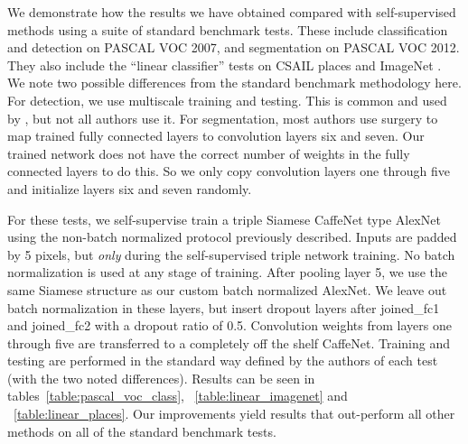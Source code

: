 \documentclass[10pt,twocolumn,letterpaper]{article}
\begin{document}
We demonstrate how the results we have obtained compared with self-supervised methods using a suite of standard benchmark tests. These include classification \cite{Krahenbuhl16}  and detection \cite{Girshick15} on PASCAL VOC 2007, and segmentation \cite{Long15,Pathak16} on PASCAL VOC 2012. They also include the ``linear classifier'' tests on CSAIL places and ImageNet \cite{Zhang16}. We note two possible differences from the standard benchmark methodology here. For detection, we use multiscale training and testing. This is common and used by \cite{Pathak17,Noroozi16a,Noroozi16b,Doersch15,Doersch17}, but not all authors use it. For segmentation, most authors use surgery to map trained fully connected layers to convolution layers six and seven. Our trained network does not have the correct number of weights in the fully connected layers to do this. So we only copy convolution layers one through five and initialize layers six and seven randomly.   

For these tests, we self-supervise train a triple Siamese CaffeNet type AlexNet using the non-batch normalized protocol previously described. Inputs are padded by 5 pixels, but \emph{only} during the self-supervised triple network training. No batch normalization is used at any stage of training. After pooling layer 5, we use the same Siamese structure as our custom batch normalized AlexNet. We leave out batch normalization in these layers, but insert dropout layers after joined\_fc1 and joined\_fc2 with a dropout ratio of 0.5. Convolution weights from layers one through five are transferred to a completely off the shelf CaffeNet.  Training and testing are performed in the standard way defined by the authors of each test (with the two noted differences). Results can be seen in tables~\ref{table:pascal_voc_class}, ~\ref{table:linear_imagenet} and ~\ref{table:linear_places}. Our improvements yield results that out-perform all other methods on all of the standard benchmark tests.



\end{document}
